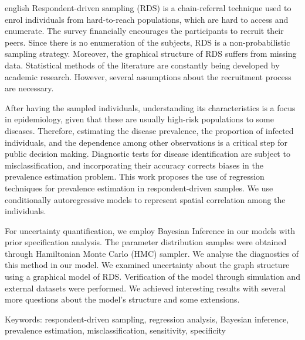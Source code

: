 \setlength{\absparsep}{18pt} 

\begin{resumo}[Abstract]
 \begin{otherlanguage*}{english}
    Respondent-driven sampling (RDS) is a chain-referral technique used to enrol individuals from hard-to-reach populations, which are hard to access and enumerate. The survey financially encourages the participants to recruit their peers. Since there is no enumeration of the subjects, RDS is a non-probabilistic sampling strategy. Moreover, the graphical structure of RDS suffers from missing data. Statistical methods of the literature are constantly being developed by academic research. However, several assumptions about the recruitment process are necessary. 

    After having the sampled individuals, understanding its characteristics is a focus in epidemiology, given that these are usually high-risk populations to some diseases. Therefore, estimating the disease prevalence, the proportion of infected individuals, and the dependence among other observations is a critical step for public decision making. Diagnostic tests for disease identification are subject to misclassification, and incorporating their accuracy corrects biases in the prevalence estimation problem. This work proposes the use of regression techniques for prevalence estimation in respondent-driven samples. We use conditionally autoregressive models to represent spatial correlation among the individuals.

    For uncertainty quantification, we employ Bayesian Inference in our models with prior specification analysis. The parameter distribution samples were obtained through Hamiltonian Monte Carlo (HMC) sampler. We analyse the diagnostics of this method in our model. We examined uncertainty about the graph structure using a graphical model of RDS. Verification of the model through simulation and external datasets were performed. We achieved interesting results with several more questions about the model's structure and some extensions.
 \end{otherlanguage*}

 Keywords: respondent-driven sampling, regression analysis, Bayesian
 inference, prevalence estimation, misclassification, sensitivity, specificity
\end{resumo}

